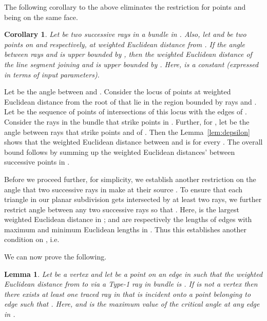 \documentclass[11pt]{article}
\newtheorem{cor}{Corollary}
\newtheorem{lemma}{Lemma}[section]
\newenvironment{proof}{\par\noindent{\bf Proof:}}{\mbox{}\hfill\\}
\begin{document}
The following corollary to the above eliminates the restriction for points  and  being on the same face.
\begin{cor}
\label{lem:depsilonC}
Let  be two successive rays in a bundle  in .
Also, let  and  be two points on  and  respectively, at weighted Euclidean distance  from .
If the angle between rays  and  is upper bounded by , then the weighted Euclidean distance of the line segment joining  and  is upper bounded by . 
Here,  is a constant (expressed in terms of input parameters).
\end{cor}
\begin{proof}
Let  be the angle between  and .
Consider the locus of points at weighted Euclidean distance  from the root of  that lie in the region bounded by rays  and .
Let  be the sequence  of points of intersections of this locus with the edges of .
Consider the rays in the bundle  that strike points in .
Further, for , let  be the angle between rays that strike points  and  of . 
Then the Lemma~\ref{lem:depsilon} shows that the weighted Euclidean distance between  and  is  for every .
The overall bound follows by summing up the weighted Euclidean distances' between successive points in .
\end{proof}

Before we proceed further, for simplicity, we establish another restriction on the angle that two successive rays in  make at their source . To ensure that each triangle in our planar subdivision gets intersected by at least two rays, we further restrict angle between any two successive rays so that .
Here,  is the largest weighted Euclidean distance in ;  and  are respectively the lengths of edges with maximum and minimum Euclidean lengths in .
Thus this establishes another condition on , i.e.

We can now prove the following.

\begin{lemma}
\label{lem:errorX}
Let  be a vertex and let  be a point on an edge  in  such that the weighted Euclidean distance from  to  via a Type-1 ray in  bundle  is .
If  is not a vertex then there exists at least one traced ray in  that is incident onto a point  belonging to edge  such that . 
Here,  and  is the maximum value of the critical angle at any edge in . 
\end{lemma}
\end{document}
